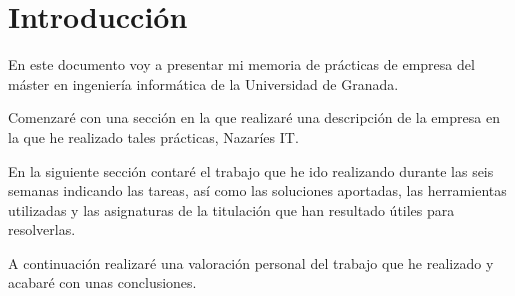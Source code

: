 \chapter{Introducción}

En este documento voy a presentar mi memoria de prácticas de empresa del máster en ingeniería informática de la Universidad de Granada.

Comenzaré con una sección en la que realizaré una descripción de la empresa en la que he realizado tales prácticas, Nazaríes IT.

En la siguiente sección contaré el trabajo que he ido realizando durante las seis semanas indicando las tareas, así como las soluciones aportadas, las herramientas utilizadas y las asignaturas de la titulación que han resultado útiles para resolverlas.

A continuación realizaré una valoración personal del trabajo que he realizado y acabaré con unas conclusiones.